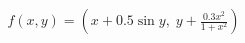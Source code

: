 \documentclass[preview]{standalone}
\begin{document}
\begin{align*}
f(x, y) = (x + 0.5\sin y,\; y + \frac{0.3x^2}{1+x^2})
\end{align*}
\end{document}
